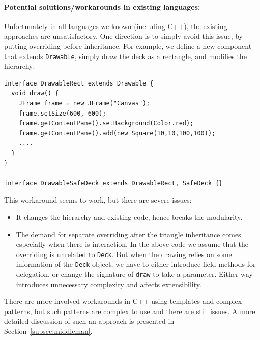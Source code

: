 \paragraph{Potential solutions/workarounds in existing languages:} Unfortunately in all languages we known
(including C++), the existing approaches are unsatisfactory.
One direction is to simply avoid this issue, by putting overriding before inheritance. For example, we define a new component
that extends \lstinline|Drawable|, simply draw the deck as a rectangle, and modifies the hierarchy:
\vspace{3pt}\begin{lstlisting}
interface DrawableRect extends Drawable {
  void draw() {
    JFrame frame = new JFrame("Canvas");
    frame.setSize(600, 600);
    frame.getContentPane().setBackground(Color.red);
    frame.getContentPane().add(new Square(10,10,100,100));
    ....
  }
}

interface DrawableSafeDeck extends DrawableRect, SafeDeck {}
\end{lstlisting} \vspace{3pt}
This workaround seems to work, but there are severe issues:
\begin{itemize}
	\item It changes the hierarchy and existing code, hence breaks the modularity.
	\item The demand for separate overriding after the triangle
          inheritance comes especially when there is
          interaction. In the above code we assume
	that the overriding is unrelated to \lstinline|Deck|. But when the drawing relies on some information of the \lstinline|Deck|
	object, we have to either introduce field methods for delegation, or change the signature of \lstinline|draw| to take a parameter.
	Either way introduces unnecessary complexity and affects extensibility.
\end{itemize}

There are more involved workarounds in C++ using templates and complex
patterns, but such patterns are complex to use and there are still issues. A more detailed discussion of
such an approach is presented in Section~\ref{subsec:middleman}.


